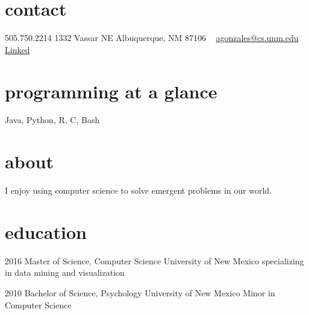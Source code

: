 \documentclass[]{friggeri-cv} %
\begin{document}


\begin{aside} %
\section{contact}
505.750.2214 
1332 Vassar NE
Albuquerque, NM 87106
~
\href{mailto:agonzales@cs.unm.edu}{agonzales@cs.unm.edu}
~
\href{http://lnkd.in/b8kfQSe}{Linked\scriptsize{\faLinkedin}}
\section{programming at a glance}
Java, Python, R, C, Bash
~
\section{about}
I enjoy using computer science to solve emergent problems in our world.
\end{aside}




\section{education}
\begin{entrylist}
\entry
{2016}
{Master of Science, {\normalfont Computer Science}}
{University of New Mexico}
{specializing in data mining and visualization}
\end{entrylist}

\begin{entrylist}
\entry
{2010}
{Bachelor of Science, {\normalfont Psychology}}
{University of New Mexico}
{Minor in Computer Science}
\end{entrylist}
\end{document}
